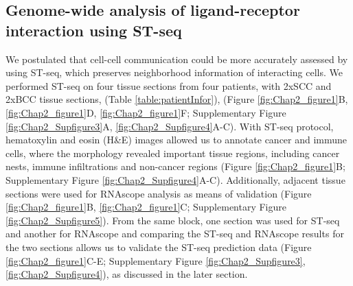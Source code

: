 \subsection{Genome-wide analysis of ligand-receptor interaction using ST-seq}
We postulated that cell-cell communication could be more accurately assessed by using ST-seq, which preserves neighborhood information of interacting cells. We performed ST-seq on four tissue sections from four patients, with 2xSCC and 2xBCC tissue sections, (Table \ref{table:patientInfor}), (Figure \ref{fig:Chap2_figure1}B, \ref{fig:Chap2_figure1}D, \ref{fig:Chap2_figure1}F; Supplementary Figure \ref{fig:Chap2_Supfigure3}A, \ref{fig:Chap2_Supfigure4}A-C).  With ST-seq protocol, hematoxylin and eosin (H\&E) images allowed us to annotate cancer and immune cells, where the morphology revealed important tissue regions, including cancer nests, immune infiltrations and non-cancer regions (Figure \ref{fig:Chap2_figure1}B; Supplementary Figure \ref{fig:Chap2_Supfigure4}A-C). Additionally, adjacent tissue sections were used for RNAscope analysis as means of validation (Figure \ref{fig:Chap2_figure1}B, \ref{fig:Chap2_figure1}C; Supplementary Figure \ref{fig:Chap2_Supfigure5}).  From the same block, one section was used for ST-seq and another for RNAscope and comparing the ST-seq and RNAscope results for the two sections allows us to validate the ST-seq prediction data (Figure \ref{fig:Chap2_figure1}C-E; Supplementary Figure \ref{fig:Chap2_Supfigure3}, \ref{fig:Chap2_Supfigure4}), as discussed in the later section. 

